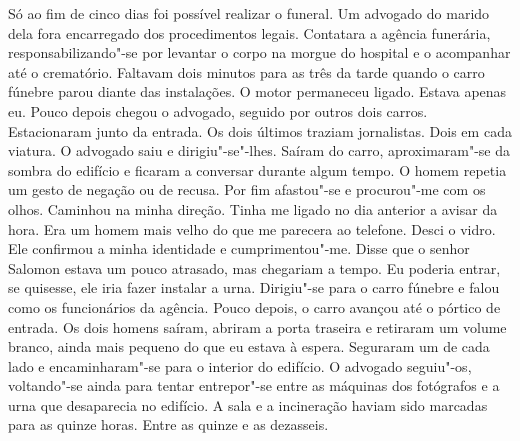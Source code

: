 Só ao fim de cinco dias foi possível realizar o funeral. Um advogado do
marido dela fora encarregado dos procedimentos legais. Contatara a
agência funerária, responsabilizando"-se por levantar o corpo na morgue
do hospital e o acompanhar até o crematório. Faltavam dois minutos para
as três da tarde quando o carro fúnebre parou diante das instalações. O
motor permaneceu ligado. Estava apenas eu. Pouco depois chegou o
advogado, seguido por outros dois carros. Estacionaram junto da entrada.
Os dois últimos traziam jornalistas. Dois em cada viatura. O advogado
saiu e dirigiu"-se"-lhes. Saíram do carro, aproximaram"-se da sombra do
edifício e ficaram a conversar durante algum tempo. O homem repetia um
gesto de negação ou de recusa. Por fim afastou"-se e procurou"-me com os
olhos. Caminhou na minha direção. Tinha me ligado no dia anterior a
avisar da hora. Era um homem mais velho do que me parecera ao telefone.
Desci o vidro. Ele confirmou a minha identidade e cumprimentou"-me.
Disse que o senhor Salomon estava um pouco atrasado, mas chegariam a
tempo. Eu poderia entrar, se quisesse, ele iria fazer instalar a urna.
Dirigiu"-se para o carro fúnebre e falou como os funcionários da
agência. Pouco depois, o carro avançou até o pórtico de entrada. Os
dois homens saíram, abriram a porta traseira e retiraram um volume
branco, ainda mais pequeno do que eu estava à espera. Seguraram um de
cada lado e encaminharam"-se para o interior do edifício. O advogado
seguiu"-os, voltando"-se ainda para tentar entrepor"-se entre as
máquinas dos fotógrafos e a urna que desaparecia no edifício. A sala e a
incineração haviam sido marcadas para as quinze horas. Entre as quinze e
as dezasseis.

